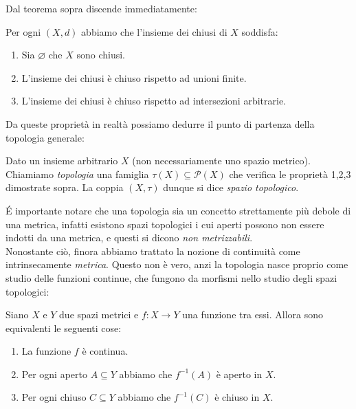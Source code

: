 \documentclass[11pt]{scrartcl}
\newcommand{\eset}{\varnothing}
\newcommand{\parti}[1]{\mathcal{P}\!\left(#1\right)}
\begin{document}
	Dal teorema sopra discende immediatamente:
	\begin{corollary}
		Per ogni $(X,d)$ abbiamo che l'insieme dei chiusi di $X$ soddisfa:
		\begin{enumerate}
			\item Sia $\eset$ che $X$ sono chiusi.
			\item L'insieme dei chiusi è chiuso rispetto ad unioni finite.
			\item L'insieme dei chiusi è chiuso rispetto ad intersezioni arbitrarie.
		\end{enumerate} 
	\end{corollary}
	Da queste proprietà in realtà possiamo dedurre il punto di partenza della topologia generale:
	\begin{definition}
		Dato un insieme arbitrario $X$ (non necessariamente uno spazio metrico). Chiamiamo \textit{topologia} una famiglia $\tau(X)\subseteq \parti{X}$ che verifica le proprietà 1,2,3 dimostrate sopra. La coppia $(X,\tau)$ dunque si dice \textit{spazio topologico}.
	\end{definition}
	\'E importante notare che una topologia sia un concetto strettamente più debole di una metrica, infatti esistono spazi topologici i cui aperti possono non essere indotti da una metrica, e questi si dicono \textit{non metrizzabili}. \\
	Nonostante ciò, finora abbiamo trattato la nozione di continuità come intrinsecamente \textit{metrica}. Questo non è vero, anzi la topologia nasce proprio come studio delle funzioni continue, che fungono da morfismi nello studio degli spazi topologici:
	\begin{theorem}
		Siano $X$ e $Y$ due spazi metrici e $f:X\to Y$ una funzione tra essi. Allora sono equivalenti le seguenti cose:
		\begin{enumerate}
			\item La funzione $f$ è continua.
			\item Per ogni aperto $A\subseteq Y$ abbiamo che $f^{-1}(A)$ è aperto in $X$.
			\item Per ogni chiuso $C\subseteq Y$ abbiamo che $f^{-1}(C)$ è chiuso in $X$.
		\end{enumerate}
	\end{theorem}
\end{document}
